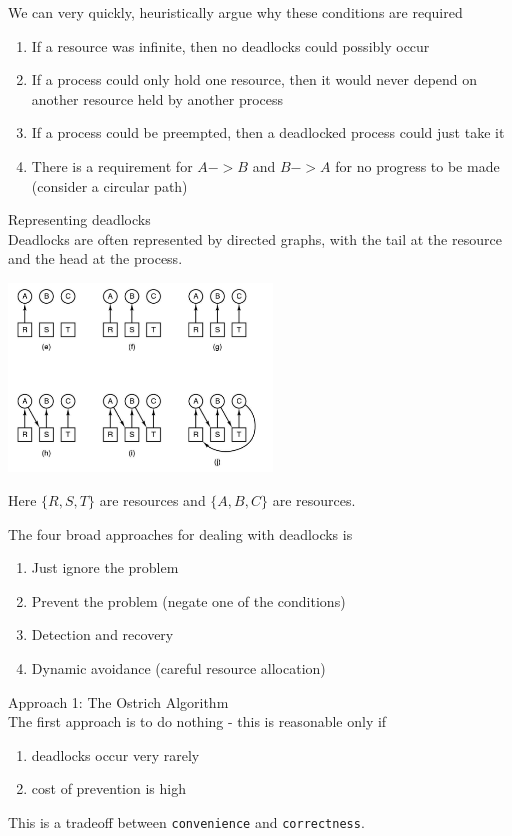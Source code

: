\documentclass[journal, letterpaper]{IEEEtran}
\begin{document}
We can very quickly, heuristically argue why these conditions are required
\begin{enumerate}
    \item If a resource was infinite, then no deadlocks could possibly occur
    \item If a process could only hold one resource, then it would never depend on another resource held by another process
    \item If a process could be preempted, then a deadlocked process could just take it
    \item There is a requirement for $A -> B$ and $B -> A$ for no progress to be made (consider a circular path)
\end{enumerate}
\begin{example}{Representing deadlocks} \\
    Deadlocks are often represented by directed graphs, with the tail at the resource and the head at the process.
    \begin{center}
        \includegraphics[width=7cm]{./photos/deadlock.png}
    \end{center}
    Here $\{R, S, T\}$ are resources and $\{A, B, C\}$ are resources.
\end{example}
The four broad approaches for dealing with deadlocks is
\begin{enumerate}
    \item Just ignore the problem
    \item Prevent the problem (negate one of the conditions)
    \item Detection and recovery
    \item Dynamic avoidance (careful resource allocation)
\end{enumerate}
\begin{theory}{Approach 1: The Ostrich Algorithm} \\
    The first approach is to do nothing - this is reasonable only if
    \begin{enumerate}
        \item deadlocks occur very rarely
        \item cost of prevention is high
    \end{enumerate}
    This is a tradeoff between \verb|convenience| and \verb|correctness|.
\end{theory}
\end{document}
